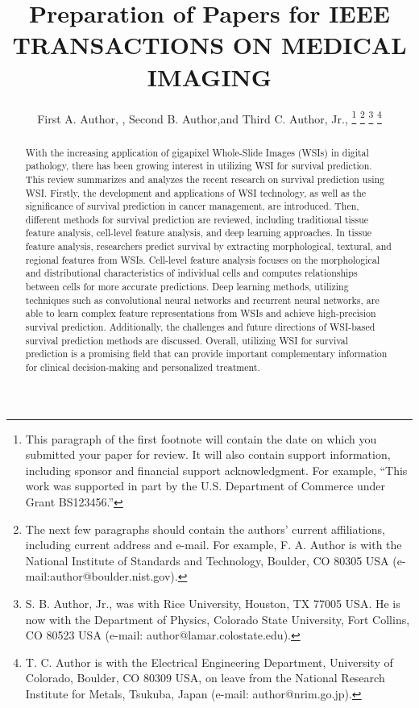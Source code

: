 \documentclass[journal,twoside,web]{ieeecolor}
\begin{document}
\title{Preparation of Papers for IEEE TRANSACTIONS ON MEDICAL IMAGING}
\author{First A. Author, , Second B. Author,and Third C. Author, Jr., 
\thanks{This paragraph of the first footnote will contain the date on which
you submitted your paper for review. It will also contain support information,
including sponsor and financial support acknowledgment. For example, 
``This work was supported in part by the U.S. Department of Commerce under Grant BS123456.'' }
\thanks{The next few paragraphs should contain the authors' current affiliations,
including current address and e-mail. For example, F. A. Author is with the
National Institute of Standards and Technology, Boulder, CO 80305 USA (e-mail:author@boulder.nist.gov). }
\thanks{S. B. Author, Jr., was with Rice University, Houston, TX 77005 USA.
He is now with the Department of Physics, Colorado State University,
Fort Collins, CO 80523 USA (e-mail: author@lamar.colostate.edu).}
\thanks{T. C. Author is with the Electrical Engineering Department,
University of Colorado, Boulder, CO 80309 USA, on leave from the National
Research Institute for Metals, Tsukuba, Japan (e-mail: author@nrim.go.jp).}}

\maketitle

\begin{abstract}
With the increasing application of gigapixel Whole-Slide Images (WSIs) in digital pathology, there has been growing interest in utilizing WSI for survival prediction. This review summarizes and analyzes the recent research on survival prediction using WSI. Firstly, the development and applications of WSI technology, as well as the significance of survival prediction in cancer management, are introduced. Then, different methods for survival prediction are reviewed, including traditional tissue feature analysis, cell-level feature analysis, and deep learning approaches. In tissue feature analysis, researchers predict survival by extracting morphological, textural, and regional features from WSIs. Cell-level feature analysis focuses on the morphological and distributional characteristics of individual cells and computes relationships between cells for more accurate predictions. Deep learning methods, utilizing techniques such as convolutional neural networks and recurrent neural networks, are able to learn complex feature representations from WSIs and achieve high-precision survival prediction. Additionally, the challenges and future directions of WSI-based survival prediction methods are discussed. Overall, utilizing WSI for survival prediction is a promising field that can provide important complementary information for clinical decision-making and personalized treatment.
\end{abstract}
\end{document}
